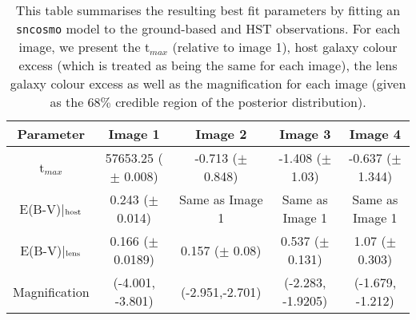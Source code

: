 \begin{table*}
\centering
\caption{This table summarises the resulting best fit parameters by fitting an \texttt{sncosmo} model to the ground-based and HST observations. For each image, we present the t$_{max}$ (relative to image 1), host galaxy colour excess (which is treated as being the same for each image), the lens galaxy colour excess as well as the magnification for each image (given as the 68$\%$ credible region of the posterior distribution).}
\begin{tabular}{|c|c|c|c|c|}
\hline
Parameter & Image 1 & Image 2 &  Image 3 & Image 4 \\
\hline\hline
t$_{max}$ &  57653.25 ($\pm$ 0.008) & -0.713 ($\pm$  0.848) & -1.408  ($\pm$ 1.03) & -0.637 ($\pm$ 1.344) \\
E(B-V)|$_{\rm host}$ & 0.243 ($\pm$ 0.014) & Same as Image 1 & Same as Image 1 & Same as Image 1  \\
E(B-V)|$_{\rm lens}$ &  0.166 ($\pm$ 0.0189) &  0.157 ($\pm$ 0.08) & 0.537 ($\pm$ 0.131) & 1.07 ($\pm$ 0.303) \\
Magnification & (-4.001, -3.801) & (-2.951,-2.701)  &  (-2.283, -1.9205) & (-1.679, -1.212)
\\

\hline
\end{tabular}
\label{tab:params}
\end{table*}